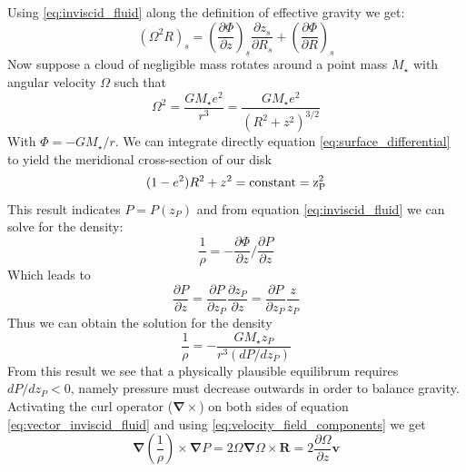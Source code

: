 \documentclass[modern]{aastex62}
\renewcommand{\vec}[1]{\mathbf{#1}}
\begin{document}
Using \ref{eq:inviscid_fluid} along the definition of effective gravity we get:
\begin{equation}\label{eq:surface_differential}
\left( \Omega^2R \right)_s = \left( \frac{\partial \Phi}{\partial z} \right)_s \frac{\partial z_s}{\partial R_s} + \left( \frac{\partial \Phi}{\partial R} \right)_s
\end{equation}
Now suppose a cloud of negligible mass rotates around a point mass $M_\star$ with angular velocity $\Omega$ such that 
\begin{equation}
\Omega^2=\frac{GM_\star e^2}{r^3}=\frac{GM_\star e^2}{(R^2+z^2)^{3/2}}
\end{equation}
With $\Phi=-GM_\star/r$.
We can integrate directly equation \ref{eq:surface_differential} to yield the meridional cross-section of our disk
\begin{equation}
(1-e^2)R^2+z^2=\rm{constant}=z^2_P
\end{equation}
This result indicates $P=P(z_P)$ and from equation \ref{eq:inviscid_fluid} we can solve for the density:
\begin{equation}
\frac{1}{\rho}=-\frac{\partial \Phi}{\partial z} / \frac{\partial P}{\partial z}
\end{equation}
Which leads to 
\begin{equation}
\frac{\partial P}{\partial z} = \frac{\partial P}{\partial z_P}\frac{\partial z_P}{\partial z} = \frac{\partial P}{\partial z_P}\frac{z }{z_P}
\end{equation}
Thus we can obtain the solution for the density
\begin{equation}
\frac{1}{\rho}=-\frac{GM_\star z_P}{r^3(dP/dz_P)}
\end{equation}
From this result we see that a physically plausible equilibrum requires $dP/dz_P<0$, namely pressure must decrease outwards in order to balance gravity. 
Activating the curl operator ($\mathbf{\nabla}\times$) on both sides of equation \ref{eq:vector_inviscid_fluid} and using  \ref{eq:velocity_field_components} we get
\begin{equation}
    \vec\nabla\left(\frac{1}{\rho}\right)\times\vec\nabla P = 2\Omega \vec\nabla \Omega \times \vec R = 2\frac{\partial \Omega}{\partial z} \vec v
\end{equation}
\end{document}

